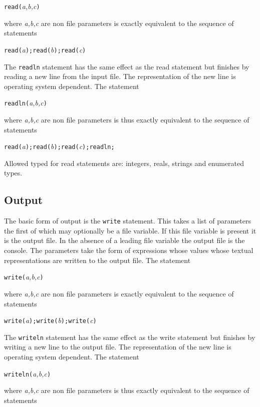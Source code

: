 {\texttt{read(}\emph{a,b,c}\texttt{) }

where \emph{a,b,c} are non file parameters is exactly equivalent to the sequence
of statements 

\texttt{read(}\emph{a}\texttt{);read(}\emph{b}\texttt{);read(}\emph{c}\texttt{) }

The \texttt{readln} statement has the same effect as the read
statement but finishes by reading a new line from the input file. The representation
of the new line is operating system dependent. The statement 

\texttt{readln(}\emph{a,b,c}\texttt{) }

where \emph{a,b,c} are non file parameters is thus exactly equivalent to the
sequence of statements 

\texttt{read(}\emph{a}\texttt{);read(}\emph{b}\texttt{);read(}\emph{c}\texttt{);readln; }

Allowed typed for read statements are: integers, reals, strings and enumerated
types.


\subsection{Output }

The basic form of output is the \texttt{write} statement. This
takes a list of parameters the first of which may optionally be a file variable.
If this file variable is present it is the output file. In the absence of a
leading file variable the output file is the console. The parameters take the
form of expressions whose values whose textual representations are written to
the output file. The statement 

\texttt{write(}\emph{a,b,c}\texttt{) }

where \emph{a,b,c} are non file parameters is exactly equivalent to the sequence
of statements 

\texttt{write(}\emph{a}\texttt{);write(}\emph{b}\texttt{);write(}\emph{c}\texttt{) }

The \texttt{writeln} statement has the same effect as the write
statement but finishes by writing a new line to the output file. The representation
of the new line is operating system dependent. The statement 

\texttt{writeln(}\emph{a,b,c}\texttt{) }

where \emph{a,b,c} are non file parameters is thus exactly equivalent to the
sequence of statements 

}
